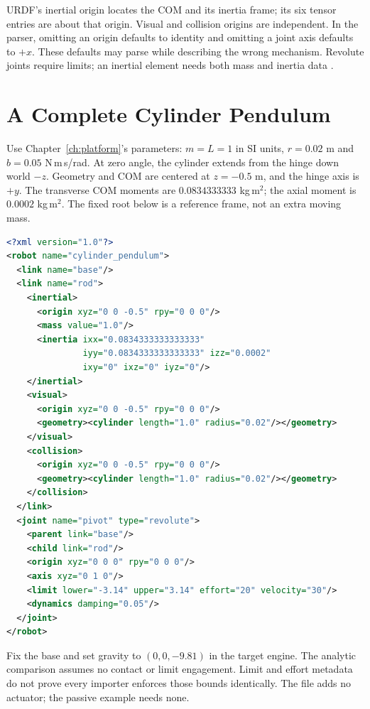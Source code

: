 URDF's inertial origin locates the COM and its inertia frame; its six tensor
entries are about that origin. Visual and collision origins are independent.
In the parser, omitting an origin defaults to identity and omitting a joint
axis defaults to $+x$. These defaults may parse while describing the wrong
mechanism. Revolute joints require limits; an inertial element needs both mass
and inertia data \cite{URDFPhysicalReview,URDFJointParserReview,URDFLinkParserReview}.

\section{A Complete Cylinder Pendulum}

Use Chapter~\ref{ch:platform}'s parameters: $m=L=1$ in SI units, $r=0.02$ m
and $b=0.05$ N\,m\,s/rad. At zero angle, the cylinder extends from the hinge
down world $-z$. Geometry and COM are centered at $z=-0.5$ m, and the hinge axis
is $+y$. The transverse COM moments are $0.0834333333$ kg\,m$^2$; the axial
moment is $0.0002$ kg\,m$^2$. The fixed root below is a reference frame, not an
extra moving mass.

\begin{lstlisting}[language=XML, caption={Complete URDF for the Analytic Cylinder Pendulum}]
<?xml version="1.0"?>
<robot name="cylinder_pendulum">
  <link name="base"/>
  <link name="rod">
    <inertial>
      <origin xyz="0 0 -0.5" rpy="0 0 0"/>
      <mass value="1.0"/>
      <inertia ixx="0.0834333333333333"
               iyy="0.0834333333333333" izz="0.0002"
               ixy="0" ixz="0" iyz="0"/>
    </inertial>
    <visual>
      <origin xyz="0 0 -0.5" rpy="0 0 0"/>
      <geometry><cylinder length="1.0" radius="0.02"/></geometry>
    </visual>
    <collision>
      <origin xyz="0 0 -0.5" rpy="0 0 0"/>
      <geometry><cylinder length="1.0" radius="0.02"/></geometry>
    </collision>
  </link>
  <joint name="pivot" type="revolute">
    <parent link="base"/>
    <child link="rod"/>
    <origin xyz="0 0 0" rpy="0 0 0"/>
    <axis xyz="0 1 0"/>
    <limit lower="-3.14" upper="3.14" effort="20" velocity="30"/>
    <dynamics damping="0.05"/>
  </joint>
</robot>
\end{lstlisting}

Fix the base and set gravity to $(0,0,-9.81)$ in the target engine. The analytic
comparison assumes no contact or limit engagement. Limit and effort metadata
do not prove every importer enforces those bounds identically. The file adds
no actuator; the passive example needs none.

